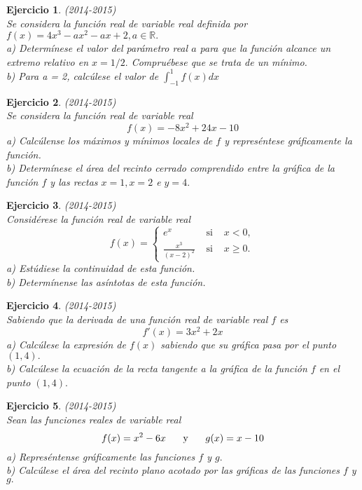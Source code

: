 \documentclass[12pt, a4paper]{amsart}
\newtheorem{ejer}{Ejercicio}
\begin{document}
\begin{ejer}\em (2014-2015)\\
Se considera la función real de variable real definida por $f(x)=4x^3-ax^2-ax+2, a\in\mathbb{R}.$\\
a) Determínese el valor del parámetro real $a$ para que la función alcance un extremo relativo en $x = 1 / 2.$ Compruébese que se trata de un mínimo.\\
b) Para a = 2, calcúlese el valor de $\int_{-1}^1f(x)dx$
\end{ejer}

\begin{ejer}\em (2014-2015)\\
Se considera la función real de variable real
\[f(x)=-8x^2+24x-10\]
a) Calcúlense los máximos y mínimos locales de $f$ y represéntese gráficamente la función.\\
b) Determínese el área del recinto cerrado comprendido entre la gráfica de la función $f$ y las rectas $x = 1, x = 2$ e $y = 4.$
\end{ejer}

\begin{ejer}\em (2014-2015)\\
Considérese la función real de variable real
\[f(x)=\left \{ \begin{matrix}
e^x & \text{ si } & x<0,\\
\frac{x^3}{(x-2)^2} & \text{ si } & x\geq 0.
\end{matrix}\right.\]
a) Estúdiese la continuidad de esta función.\\
b) Determínense las asíntotas de esta función.
\end{ejer}

\begin{ejer}\em (2014-2015)\\
Sabiendo que la derivada de una función real de variable real $f$ es
\[f'(x)=3x^2+2x\]
a) Calcúlese la expresión de $f(x)$ sabiendo que su gráfica pasa por el punto $(1, 4).$\\
b) Calcúlese la ecuación de la recta tangente a la gráfica de la función $f$ en el punto $(1, 4).$
\end{ejer}

\begin{ejer}\em (2014-2015)\\
Sean las funciones reales de variable real
\[f(x)=x^2-6x \hspace*{5mm}\text{ y }\hspace*{5mm} g(x)=x-10\]
a) Represéntense gráficamente las funciones $f$ y $g.$\\
b) Calcúlese el área del recinto plano acotado por las gráficas de las funciones $f$ y $g.$
\end{ejer}
\end{document}
